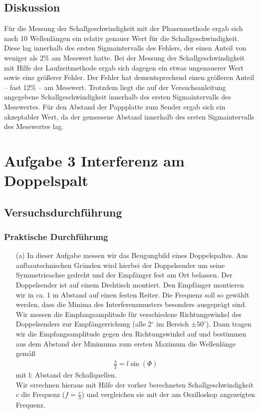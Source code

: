 \documentclass[12pt]{scrartcl}
\begin{document}
\subsection{Diskussion}
Für die Messung der Schallgeschwindigkeit mit der Phasenmethode ergab sich nach 10 Wellenlängen ein relativ genauer Wert für die Schallgeschwindigkeit. Diese lag innerhalb des ersten Sigmaintervalls des Fehlers, der einen Anteil von weniger als 2\% am Messwert hatte.
Bei der Messung der Schallgeschwindigkeit mit Hilfe der Laufzeitmethode ergab sich dagegen ein etwas ungenauerer Wert sowie eine größerer Fehler. Der Fehler hat dementsprechend einen größeren Anteil -- fast 12\% -- am Messwert. Trotzdem liegt die auf der Versuchsanleitung angegebene Schallgeschwindigkeit innerhalb des ersten Sigmaintervalls des Messwertes.
Für den Abstand der Pappplatte zum Sender ergab sich ein akzeptabler Wert, da der gemessene Abstand innerhalb des ersten Sigmaintervalls des Messwertes lag.
\section{Aufgabe 3 Interferenz am Doppelspalt}
\subsection{Versuchsdurchführung}
\subsubsection{Praktische Durchführung}
\begin{itemize}
\item[(a)]
In dieser Aufgabe messen wir das Beugungbild eines Doppelspaltes. Aus aufbautechnischen Gründen wird hierbei der Doppelsender um seine Symmetrieachse gedreht und der Empfänger fest am Ort belassen. Der Doppelsender ist auf einem Drehtisch montiert. Den Empfänger montieren wir in ca. 1 m Abstand auf einen festen Reiter. Die Frequenz soll so gewählt werden, dass die Minima des Interferenzmusters besonders ausgeprägt sind.
Wir messen die Empfangsamplitude für verschiedene Richtungswinkel des Doppelsenders zur Empfängerrichung (alle 2$^{\circ}$ im Bereich $\pm 50^{\circ}$). Dann tragen wir die Empfangsamplitude gegen den Richtungswinkel auf und bestimmen aus dem Abstand der Minimuma zum ersten Maximum die Wellenlänge gemäß
\begin{align}
\frac{\lambda}{2} = l\sin(\Phi)
\end{align}
mit l: Abstand der Schallquellen.\\
Wir errechnen hieraus mit Hilfe der vorher berechneten Schallgeschwindigkeit $c$ die Frequenz ($f = \frac{c}{\lambda}$) und vergleichen sie mit der am Oszilloskop angezeigten Frequenz.
\end{itemize}
\end{document}

